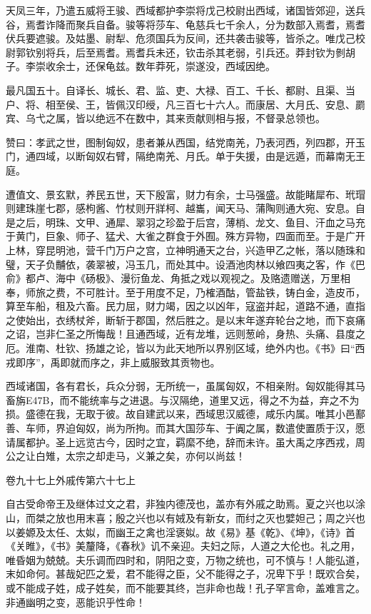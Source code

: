 \documentclass[12pt,UTF8]{ctexbook}
\begin{document}
天凤三年，乃遣五威将王骏、西域都护李崇将戊己校尉出西域，诸国皆郊迎，送兵谷，焉耆诈降而聚兵自备。骏等将莎车、龟慈兵七千余人，分为数部入焉耆，焉耆伏兵要遮骏。及姑墨、尉犁、危须国兵为反间，还共袭击骏等，皆杀之。唯戊己校尉郭钦别将兵，后至焉耆。焉耆兵未还，钦击杀其老弱，引兵还。莽封钦为剼胡子。李崇收余士，还保龟兹。数年莽死，崇遂没，西域因绝。



最凡国五十。自译长、城长、君、监、吏、大禄、百工、千长、都尉、且渠、当户、将、相至侯、王，皆佩汉印绶，凡三百七十六人。而康居、大月氏、安息、罽宾、乌弋之属，皆以绝远不在数中，其来贡献则相与报，不督录总领也。



赞曰：孝武之世，图制匈奴，患者兼从西国，结党南羌，乃表河西，列四郡，开玉门，通四域，以断匈奴右臂，隔绝南羌、月氏。单于失援，由是远遁，而幕南无王庭。



遭值文、景玄默，养民五世，天下殷富，财力有余，士马强盛。故能睹犀布、玳瑁则建珠崖七郡，感枸酱、竹杖则开牂柯、越巂，闻天马、蒲陶则通大宛、安息。自是之后，明珠、文甲、通犀、翠羽之珍盈于后宫，薄梢、龙文、鱼目、汗血之马充于黄门，巨象、师子、猛犬、大雀之群食于外囿。殊方异物，四面而至。于是广开上林，穿昆明池，营千门万户之宫，立神明通天之台，兴造甲乙之帐，落以随珠和璧，天子负黼依，袭翠被，冯玉几，而处其中。设酒池肉林以飨四夷之客，作《巴俞》都卢、海中《砀极》、漫衍鱼龙、角抵之戏以观视之。及赂遗赠送，万里相奉，师旅之费，不可胜计。至于用度不足，乃榷酒酤，管盐铁，铸白金，造皮币，算至车船，租及六畜。民力屈，财力竭，因之以凶年，寇盗并起，道路不通，直指之使始出，衣绣杖斧，断斩于郡国，然后胜之。是以末年遂弃轮台之地，而下哀痛之诏，岂非仁圣之所悔哉！且通西域，近有龙堆，远则葱岭，身热、头痛、县度之厄。淮南、杜钦、扬雄之论，皆以为此天地所以界别区域，绝外内也。《书》曰“西戎即序”，禹即就而序之，非上威服致其贡物也。



西域诸国，各有君长，兵众分弱，无所统一，虽属匈奴，不相亲附。匈奴能得其马畜旃E47B，而不能统率与之进退。与汉隔绝，道里又远，得之不为益，弃之不为损。盛德在我，无取于彼。故自建武以来，西域思汉威德，咸乐内属。唯其小邑鄯善、车师，界迫匈奴，尚为所拘。而其大国莎车、于阗之属，数遣使置质于汉，愿请属都护。圣上远览古今，因时之宜，羁縻不绝，辞而未许。虽大禹之序西戎，周公之让白雉，太宗之却走马，义兼之矣，亦何以尚兹！





卷九十七上外戚传第六十七上



自古受命帝王及继体过文之君，非独内德茂也，盖亦有外戚之助焉。夏之兴也以涂山，而桀之放也用末喜；殷之兴也以有娀及有{新女}，而纣之灭也嬖妲己；周之兴也以姜嫄及太任、太姒，而幽王之禽也淫褒姒。故《易》基《乾》、《坤》，《诗》首《关睢》，《书》美釐降，《春秋》讥不亲迎。夫妇之际，人道之大伦也。礼之用，唯昏姻为兢兢。夫乐调而四时和，阴阳之变，万物之统也，可不慎与！人能弘道，末如命何。甚哉妃匹之爱，君不能得之臣，父不能得之子，况卑下乎！既欢合矣，或不能成子姓，成子姓矣，而不能要其终，岂非命也哉！孔子罕言命，盖难言之。非通幽明之变，恶能识乎性命！
\end{document}
